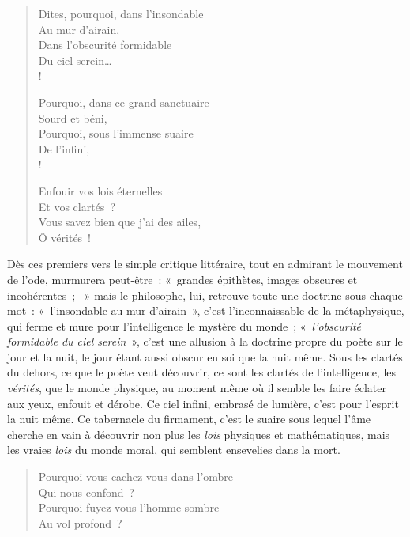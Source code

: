 \documentclass[french,twoside]{book} %
\begin{document}
\begin{verse}
Dites, pourquoi, dans l’insondable\\
Au mur d’airain,\\
Dans l’obscurité formidable\\
Du ciel serein…\\!

Pourquoi, dans ce grand sanctuaire\\
Sourd et béni,\\
Pourquoi, sous l’immense suaire\\
De l’infini,\\!

Enfouir vos lois éternelles\\
Et vos clartés ?\\
Vous savez bien que j’ai des ailes,\\
Ô vérités !\\
\end{verse}

\noindent Dès ces premiers vers le simple critique littéraire, tout en admirant le mouvement de l’ode, murmurera peut-être : « grandes épithètes, images obscures et incohérentes ;  » mais le philosophe, lui, retrouve toute une doctrine sous chaque mot : « l’insondable au mur d’airain », c’est l’inconnaissable de la métaphysique, qui ferme et mure pour l’intelligence le mystère du monde ; « \emph{l’obscurité formidable du ciel serein} », c’est une allusion à la doctrine propre du poète sur le jour et la nuit, le jour étant aussi obscur en soi que la nuit même. Sous les clartés du dehors, ce que le poète veut découvrir, ce sont les clartés de l’intelligence, les \emph{vérités}, que le monde physique, au moment même où il semble les faire éclater aux yeux, enfouit et dérobe. Ce ciel infini, embrasé de lumière, c’est pour l’esprit la nuit même. Ce tabernacle du firmament, c’est le suaire sous lequel l’âme cherche en vain à découvrir non plus les \emph{lois} physiques et mathématiques, mais les vraies \emph{lois} du monde moral, qui semblent ensevelies dans la mort.\par


\begin{verse}
Pourquoi vous cachez-vous dans l’ombre\\
Qui nous confond ?\\
Pourquoi fuyez-vous l’homme sombre\\
Au vol profond ?\\
\end{verse}
\end{document}
